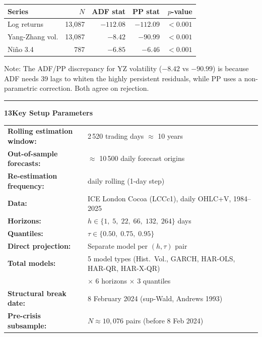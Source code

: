 \documentclass[10pt,a4paper]{article}
\newcommand{\sectionrule}{\vspace{0.3em}\hrule\vspace{0.5em}}
\begin{document}
\begin{center}
\begin{tabular}{lrrrr}
\toprule
Series & $N$ & ADF stat & PP stat & $p$-value \\
\midrule
Log returns       & 13,087 & $-112.08$ & $-112.09$ & $<0.001$ \\
Yang-Zhang vol.   & 13,087 &   $-8.42$ &  $-90.99$ & $<0.001$ \\
Ni\~no 3.4        &    787 &   $-6.85$ &   $-6.46$ & $<0.001$ \\
\bottomrule
\end{tabular}
\end{center}

Note: The ADF/PP discrepancy for YZ volatility ($-8.42$ vs $-90.99$) is
because ADF needs 39 lags to whiten the highly persistent residuals, while
PP uses a non-parametric correction. Both agree on rejection.

\sectionrule

\textbf{13\quad Key Setup Parameters}

\begin{tabular}{@{}ll@{}}
\textbf{Rolling estimation window:} & 2\,520 trading days $\approx$ 10 years \\
\textbf{Out-of-sample forecasts:}   & $\approx$ 10\,500 daily forecast origins \\
\textbf{Re-estimation frequency:}   & daily rolling (1-day step) \\
\textbf{Data:}                       & ICE London Cocoa (LCCc1), daily OHLC+V, 1984--2025 \\
\textbf{Horizons:}                   & $h \in \{1,\; 5,\; 22,\; 66,\; 132,\; 264\}$ days \\
\textbf{Quantiles:}                  & $\tau \in \{0.50,\; 0.75,\; 0.95\}$ \\
\textbf{Direct projection:}         & Separate model per $(h, \tau)$ pair \\
\textbf{Total models:}              & 5 model types (Hist.\ Vol., GARCH, HAR-OLS, HAR-QR, HAR-X-QR)\\
                                     & $\times$ 6 horizons $\times$ 3 quantiles \\
\textbf{Structural break date:}     & 8 February 2024 (sup-Wald, Andrews 1993) \\
\textbf{Pre-crisis subsample:}       & $N \approx 10{,}076$ pairs (before 8 Feb 2024) \\
\end{tabular}
\end{document}
